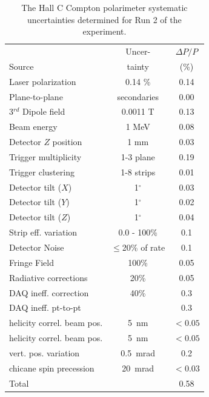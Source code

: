 \begin{table}[ttbh]
\scriptsize{
  \centering
    \begin{tabular}{|l|c|c|} \hline
                            & Uncer- & $\Delta P/P$ \\ 
      Source 				& tainty & (\%) \\ \hline
      Laser polarization   		& 0.14 \%      & 0.14     \\
      Plane-to-plane  			& secondaries      & 0.00     \\
      3$^{rd}$ Dipole field		& 0.0011 T    & 0.13      \\
      Beam energy    			& 1 MeV   & 0.08     \\
      Detector $Z$ position      & 1 mm         & 0.03     \\
      Trigger multiplicity       & 1-3 plane         & 0.19     \\
      Trigger clustering         & 1-8 strips  & 0.01     \\
      Detector tilt ($X$)        & 1$^\circ$   & 0.03     \\
      Detector tilt ($Y$)        & 1$^\circ$   & 0.02     \\
      Detector tilt ($Z$)        & 1$^\circ$   & 0.04     \\
      Strip eff. variation        & 0.0 - 100\%   & 0.1     \\
      Detector Noise	         & $\leq$20\% of rate  & 0.1     \\
      Fringe Field		         & 100\%       & 0.05     \\
      Radiative corrections      & 20\%		   & 0.05     \\
      DAQ ineff. correction & 40\%  & 0.3     \\
      DAQ ineff. pt-to-pt	 & 		& 0.3     \\ 
      helicity correl. beam pos. & 5~nm & $<0.05$\\ 
      helicity correl. beam pos. & 5~nm & $<0.05$\\ 
      vert. pos. variation & 0.5~mrad & 0.2\\
      chicane spin precession    & 20~mrad & $<0.03$ \\ \hline
      Total                          &        & 0.58     \\ \hline
    \end{tabular}
  \caption{The Hall C Compton polarimeter systematic uncertainties determined for Run 2 of the experiment.}
  \label{tab:compton_systematics}
}
\end{table}




